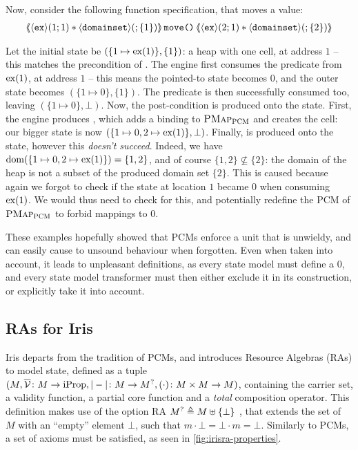 Now, consider the following function specification, that moves a value:
\begin{align*}
\ESLtriple
	{\corepred{\exP}{1}{1} * \corepred{\domainset}{}{\{1\}}}
	{move()}
	{\corepred{\exP}{2}{1} * \corepred{\domainset}{}{\{2\}}}
\end{align*}

Let the initial state be $(\{ 1\mapsto \text{ex}(1)\}, \{ 1\} )$: a heap with one cell, at address $1$ -- this matches the precondition of . The engine first consumes the \exP{} predicate from $\text{ex}(1)$, at address $1$ -- this means the pointed-to state becomes $0$, and the outer state becomes $(\{ 1\mapsto 0\}, \{ 1\})$. The \domainset{} predicate is then successfully consumed too, leaving $(\{ 1\mapsto 0\},\bot)$. Now, the post-condition is produced onto the state. First, the engine produces , which adds a binding to $\textsc{PMap}_{\textsc{PCM}}$ and creates the cell: our bigger state is now $(\{ 1\mapsto 0, 2\mapsto \text{ex}(1)\},\bot)$. Finally,  is produced onto the state, however this \emph{doesn't succeed}. Indeed, we have $\operatorname{dom}(\{1\mapsto 0, 2\mapsto \text{ex}(1)\})=\{1,2\}$, and of course $\{1,2\}\not\subseteq \{2\}$: the domain of the heap is not a subset of the produced domain set $\{2\}$. This is caused because again we forgot to check if the state at location $1$ became $0$ when consuming $\text{ex}(1)$. We would thus need to check for this, and potentially redefine the PCM of $\textsc{PMap}_{\textsc{PCM}}$ to forbid mappings to $0$.

These examples hopefully showed that PCMs enforce a unit that is unwieldy, and can easily cause to unsound behaviour when forgotten. Even when taken into account, it leads to unpleasant definitions, as every state model must define a $0$, and every state model transformer must then either exclude it in its construction, or explicitly take it into account.

\subsection{RAs for Iris}

Iris \cite{iris1,iris2,iris3,iris} departs from the tradition of PCMs, and introduces Resource Algebras (RAs) to model state, defined as a tuple ${(M, \overline{\cal V}\colon M\rightarrow \text{iProp}, |-|\colon M\rightarrow M^?, (\cdot)\colon M\times M\rightarrow M)}$, containing the carrier set, a validity function, a partial core function and a \emph{total} composition operator. This definition makes use of the option RA $M^?\triangleq M\uplus\{\bot\}$ \cite{iris-option}, that extends the set of $M$ with an ``empty'' element $\bot$, such that $m\cdot\bot=\bot\cdot m=\bot$. Similarly to PCMs, a set of axioms must be satisfied, as seen in \autoref{fig:irisra-properties}.

